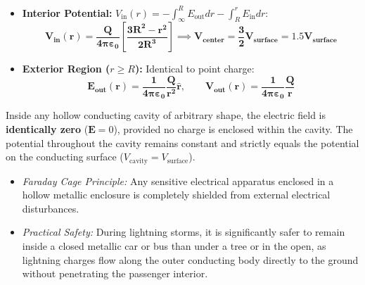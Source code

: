 \documentclass[10pt,twoside,openright]{book}
\begin{document}
\begin{formulabox}
\begin{itemize}
  \begin{equation}
    E(r) \cdot 4\pi r^2 = \frac{Q r^3}{\varepsilon_0 R^3} \implies \mathbf{E_{\text{in}}(r) = \frac{1}{4\pi\varepsilon_0}\frac{Q r}{R^3}\hat{\mathbf{r}} = \frac{\rho r}{3\varepsilon_0}\hat{\mathbf{r}}}
  \end{equation}
  Electric field increases linearly with radial distance $r$ from center.
  \item \textbf{Interior Potential:} $V_{\text{in}}(r) = -\int_\infty^R E_{\text{out}} dr - \int_R^r E_{\text{in}} dr$:
  \begin{equation}
    \mathbf{V_{\text{in}}(r) = \frac{Q}{4\pi\varepsilon_0}\left[\frac{3R^2 - r^2}{2R^3}\right]} \implies \mathbf{V_{\text{center}} = \frac{3}{2} V_{\text{surface}} = 1.5 V_{\text{surface}}}
  \end{equation}
  \item \textbf{Exterior Region ($r \ge R$):} Identical to point charge:
  \begin{equation}
    \mathbf{E_{\text{out}}(r) = \frac{1}{4\pi\varepsilon_0}\frac{Q}{r^2}\hat{\mathbf{r}}}, \qquad \mathbf{V_{\text{out}}(r) = \frac{1}{4\pi\varepsilon_0}\frac{Q}{r}}
  \end{equation}
\end{itemize}
\end{formulabox}

\begin{ncertbox}
Inside any hollow conducting cavity of arbitrary shape, the electric field is \textbf{identically zero} ($\mathbf{E} = 0$), provided no charge is enclosed within the cavity. The potential throughout the cavity remains constant and strictly equals the potential on the conducting surface ($V_{\text{cavity}} = V_{\text{surface}}$).
\begin{itemize}
  \item \textit{Faraday Cage Principle:} Any sensitive electrical apparatus enclosed in a hollow metallic enclosure is completely shielded from external electrical disturbances.
  \item \textit{Practical Safety:} During lightning storms, it is significantly safer to remain inside a closed metallic car or bus than under a tree or in the open, as lightning charges flow along the outer conducting body directly to the ground without penetrating the passenger interior.
\end{itemize}
\end{ncertbox}
\end{document}
